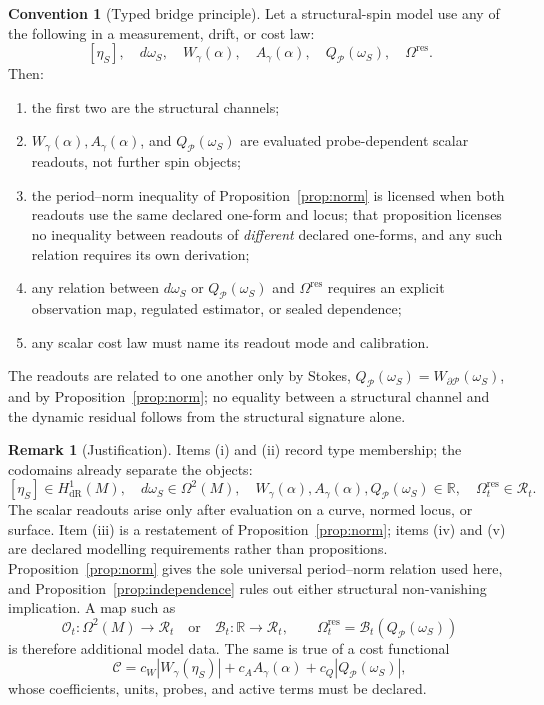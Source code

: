 \documentclass[11pt]{article}
\theoremstyle{definition}
\newtheorem{convention}[theorem]{Convention}
\newtheorem{remark}[theorem]{Remark}
\newcommand{\dR}{\mathrm{dR}}
\newcommand{\Omres}{\Omega^{\mathrm{res}}}
\begin{document}
\begin{convention}[Typed bridge principle]\label{thm:typed-bridge}
Let a structural-spin model use any of the following in a measurement,
drift, or cost law:
\[
[\eta_S],\quad d\omega_S,\quad
W_\gamma(\alpha),\quad A_\gamma(\alpha),\quad
Q_{\mathcal P}(\omega_S),\quad \Omres.
\]
Then:
\begin{enumerate}[label=\textup{(\roman*)},leftmargin=2.2em]
  \item the first two are the structural channels;
  \item \(W_\gamma(\alpha),A_\gamma(\alpha)\), and
        \(Q_{\mathcal P}(\omega_S)\) are evaluated probe-dependent
        scalar readouts, not further spin objects;
  \item the period--norm inequality of Proposition~\ref{prop:norm} is
        licensed when both readouts use the same declared one-form and
        locus; that proposition licenses no inequality between readouts of
        \emph{different} declared one-forms, and any such relation requires
        its own derivation;
  \item any relation between \(d\omega_S\) or
        \(Q_{\mathcal P}(\omega_S)\) and \(\Omres\) requires an
        explicit observation map, regulated
        estimator, or sealed dependence;
  \item any scalar cost law must name its readout mode and calibration.
\end{enumerate}
The readouts are related to one another only by Stokes,
\(Q_{\mathcal P}(\omega_S)=W_{\partial\mathcal P}(\omega_S)\), and by
Proposition~\ref{prop:norm}; no equality between a structural channel and
the dynamic residual follows from the structural signature alone.
\end{convention}

\begin{remark}[Justification]
Items (i) and (ii) record type membership; the codomains already separate
the objects:
\[
[\eta_S]\in H^1_{\dR}(M),\quad
d\omega_S\in\Omega^2(M),\quad
W_\gamma(\alpha),A_\gamma(\alpha),Q_{\mathcal P}(\omega_S)
\in\mathbb R,\quad \Omres_t\in\mathcal R_t.
\]
The scalar readouts arise only after evaluation on a curve, normed
locus, or surface.  Item (iii) is a restatement of
Proposition~\ref{prop:norm}; items (iv) and (v) are declared modelling
requirements rather than propositions.  Proposition~\ref{prop:norm} gives
the sole universal period--norm relation used here, and
Proposition~\ref{prop:independence} rules out either structural
non-vanishing implication.  A map such as
\[
\mathcal O_t:\Omega^2(M)\longrightarrow\mathcal R_t
\quad\text{or}\quad
\mathcal B_t:\mathbb R\longrightarrow\mathcal R_t,\qquad
\Omres_t=\mathcal B_t\!\left(Q_{\mathcal P}(\omega_S)\right)
\]
is therefore additional model data.  The same is true of a cost
functional
\[
\mathcal C
 =c_W|W_\gamma(\eta_S)|+c_AA_\gamma(\alpha)
  +c_Q|Q_{\mathcal P}(\omega_S)|,
\]
whose coefficients, units, probes, and active terms must be declared.
\end{remark}
\end{document}
